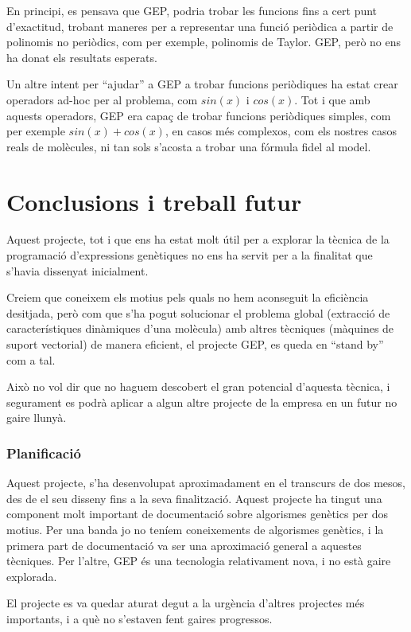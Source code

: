 En principi, es pensava que GEP, podria trobar les funcions fins a cert punt
d'exactitud, trobant maneres per a representar una funció periòdica a partir de
polinomis no periòdics, com per exemple, polinomis de Taylor. GEP, però no ens
ha donat els resultats esperats.

Un altre intent per ``ajudar'' a GEP a trobar funcions periòdiques ha estat
crear operadors ad-hoc per al problema, com $sin(x)$ i $cos(x)$.  Tot i que amb
aquests operadors, GEP era capaç de trobar funcions periòdiques simples, com per
exemple $sin(x)+cos(x)$, en casos més complexos, com els nostres casos reals de
molècules, ni tan sols s'acosta a trobar una fórmula fidel al model.

\section{Conclusions i treball futur} %
\label{sec:GConclusions i treball futur}
Aquest projecte, tot i que ens ha estat molt útil per a explorar la tècnica de
la programació d'expressions genètiques no ens ha servit per a la finalitat que
s'havia dissenyat inicialment.

Creiem que coneixem els motius pels quals no hem aconseguit la eficiència
desitjada, però com que s'ha pogut solucionar el problema global (extracció de
característiques dinàmiques d'una molècula) amb altres tècniques (màquines de
suport vectorial) de manera eficient, el projecte GEP, es queda en ``stand by''
com a tal.

Això no vol dir que no haguem descobert el gran potencial d'aquesta tècnica, i
segurament es podrà aplicar a algun altre projecte de la empresa en un futur no
gaire llunyà.

\subsubsection{Planificació} %
\label{ssub:GPlan}

Aquest projecte, s'ha desenvolupat aproximadament en el transcurs de dos mesos,
des de el seu disseny fins a la seva finalització.  Aquest projecte ha tingut una
component molt important de documentació sobre algorismes genètics per dos
motius.  Per una banda jo no teníem coneixements de algorismes genètics, i la
primera part de documentació va ser una aproximació general a aquestes
tècniques.  Per l'altre, GEP és una tecnologia relativament nova, i no està
gaire explorada. 

El projecte es va quedar aturat degut a la urgència d'altres projectes més
importants, i a què no s'estaven fent gaires progressos.

